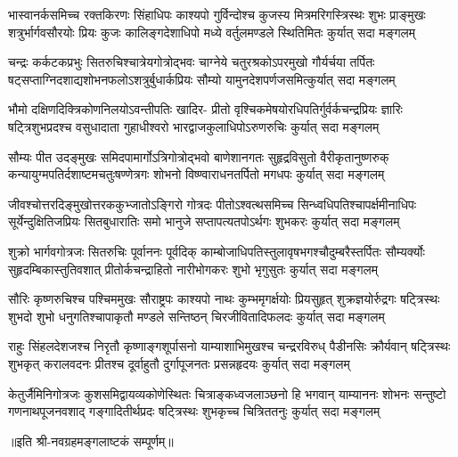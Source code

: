 
\fourlineindentedshloka
{भास्वानर्कसमिच्च रक्तकिरणः सिंहाधिपः काश्यपो}
{गुर्विन्दोश्च कुजस्य मित्रमरिगस्त्रिस्थः शुभः प्राङ्मुखः}
{शत्रुर्भार्गवसौरयोः प्रियः कुजः कालिङ्गदेशाधिपो}
{मध्ये वर्तुलमण्डले स्थितिमितः कुर्यात् सदा मङ्गलम्}

\fourlineindentedshloka
{चन्द्रः कर्कटकप्रभुः सितरुचिश्चात्रेयगोत्रोद्भवः}
{चाग्नेये चतुरश्रकोऽपरमुखो गौर्यर्चया तर्पितः}
{षट्सप्ताग्निदशाद्यशोभनफलोऽशत्रुर्बुधार्कप्रियः}
{सौम्यो यामुनदेशपर्णजसमित्कुर्यात् सदा मङ्गलम्}

\fourlineindentedshloka
{भौमो दक्षिणदिक्त्रिकोणनिलयोऽवन्तीपतिः खादिर-}
{प्रीतो वृश्चिकमेषयोरधिपतिर्गुर्वर्कचन्द्रप्रियः}
{ज्ञारिः षट्त्रिशुभप्रदश्च वसुधादाता गुहाधीश्वरो}
{भारद्वाजकुलाधिपोऽरुणरुचिः कुर्यात् सदा मङ्गलम्}

\fourlineindentedshloka
{सौम्यः पीत उदङ्मुखः समिदपामार्गोऽत्रिगोत्रोद्भवो}
{बाणेशानगतः सुहृद्रविसुतो वैरीकृतानुष्णरुक्}
{कन्यायुग्मपतिर्दशाष्टमचतुःषण्णेत्रगः शोभनो}
{विष्ण्वाराधनतर्पितो मगधपः कुर्यात् सदा मङ्गलम्}

\fourlineindentedshloka
{जीवश्चोत्तरदिङ्मुखोत्तरककुभ्जातोऽङ्गिरो गोत्रदः}
{पीतोऽश्वत्थसमिच्च सिन्ध्वधिपतिश्चापर्क्षमीनाधिपः}
{सूर्येन्दुक्षितिजप्रियः सितबुधारातिः समो भानुजे}
{सप्तापत्यतपोऽर्थगः शुभकरः कुर्यात् सदा मङ्गलम्}

\fourlineindentedshloka
{शुक्रो भार्गवगोत्रजः सितरुचिः पूर्वाननः पूर्वदिक्}
{काम्बोजाधिपतिस्तुलावृषभगश्चौदुम्बरैस्तर्पितः}
{सौम्यर्क्योः सुहृदम्बिकास्तुतिवशात् प्रीतोर्कचन्द्राहितो}
{नारीभोगकरः शुभो भृगुसुतः कुर्यात् सदा मङ्गलम्}

\fourlineindentedshloka
{सौरिः कृष्णरुचिश्च पश्चिममुखः सौराष्ट्रपः काश्यपो}
{नाथः कुम्भमृगर्क्षयोः प्रियसुहृत् शुक्रज्ञयोर्रुद्रगः}
{षट्त्रिस्थः शुभदो शुभो  धनुगतिश्चापाकृतौ मण्डले}
{सन्तिष्ठन् चिरजीवितादिफलदः कुर्यात् सदा मङ्गलम्}

\fourlineindentedshloka
{राहुः सिंहलदेशजश्च निरृतौ कृष्णाङ्गशूर्पासनो}
{याम्याशाभिमुखश्च चन्द्ररविरुध् पैडीनसिः क्रौर्यवान्}
{षट्त्रिस्थः शुभकृत् करालवदनः प्रीतश्च दूर्वाहुतौ}
{दुर्गापूजनतः प्रसन्नहृदयः कुर्यात् सदा मङ्गलम्}

\fourlineindentedshloka
{केतुर्जैमिनिगोत्रजः कुशसमिद्वायव्यकोणेस्थितः}
{चित्राङ्कध्वजलाञ्छनो हि भगवान् याम्याननः शोभनः}
{सन्तुष्टो गणनाथपूजनवशाद् गङ्गादितीर्थप्रदः}
{षट्त्रिस्थः शुभकृच्च चित्रिततनुः कुर्यात् सदा मङ्गलम्}

॥इति श्री-नवग्रहमङ्गलाष्टकं सम्पूर्णम्॥